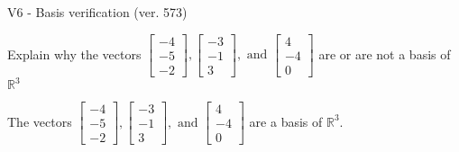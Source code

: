 \begin{exercise}
  \begin{exerciseTitle}V6 - Basis verification (ver. 573)\end{exerciseTitle}
  \begin{exerciseStatement}
    Explain why the vectors \(\left[\begin{array}{r}
-4 \\
-5 \\
-2
\end{array}\right] , \left[\begin{array}{r}
-3 \\
-1 \\
3
\end{array}\right] , \text{ and } \left[\begin{array}{r}
4 \\
-4 \\
0
\end{array}\right]\) are or are not a basis of \(\mathbb{R}^3\)	


  \end{exerciseStatement}
  \begin{exerciseAnswer}
   The vectors \(\left[\begin{array}{r}
-4 \\
-5 \\
-2
\end{array}\right] , \left[\begin{array}{r}
-3 \\
-1 \\
3
\end{array}\right] , \text{ and } \left[\begin{array}{r}
4 \\
-4 \\
0
\end{array}\right]\) 
  	 are  a basis of \(\mathbb{R}^3\).
  


  \end{exerciseAnswer}
\end{exercise}